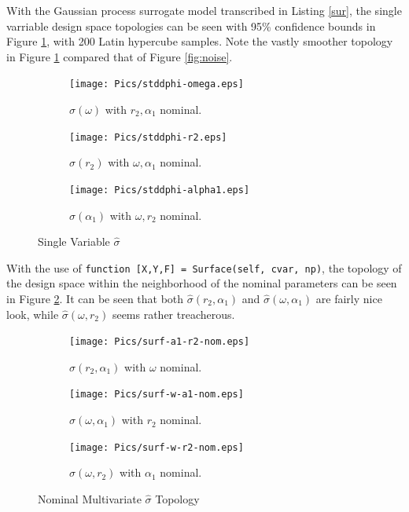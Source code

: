 \documentclass{article}
\begin{document}
With the Gaussian process surrogate model transcribed in Listing \ref{sur}, the single varriable design space topologies can be seen with 95\% confidence bounds in Figure \ref{fig:gauss}, with 200 Latin hypercube samples. Note the vastly smoother topology in Figure \ref{fig:gauss} compared that of Figure \ref{fig:noise}.

\begin{figure}

\begin{subfigure}{0.49\textwidth}
\texttt{[image: Pics/stddphi-omega.eps]} 
\caption{$\hat{\sigma}(\omega)$ with $r_2, \alpha_1$ nominal.}
\end{subfigure}

\begin{subfigure}{0.49\textwidth}
\texttt{[image: Pics/stddphi-r2.eps]}
\caption{$\hat{\sigma}(r_2)$ with $\omega, \alpha_1$ nominal.}
\end{subfigure}

\begin{subfigure}{0.49\textwidth}
\texttt{[image: Pics/stddphi-alpha1.eps]}
\caption{$\hat{\sigma}(\alpha_1)$ with $\omega, r_2$ nominal.}
\end{subfigure}

\caption{Single Variable $\hat{\sigma}$}
\label{fig:gauss}
\end{figure}

With the use of \lstinline{function [X,Y,F] = Surface(self, cvar, np)}, the topology of the design space within the neighborhood of the nominal parameters can be seen in Figure \ref{fig:nomtop}. It can be seen that both $\hat{\sigma}(r_2,\alpha_1)$ and $\hat{\sigma}(\omega,\alpha_1)$ are fairly nice look, while $\hat{\sigma}(\omega,r_2)$ seems rather treacherous.

\begin{figure}

\begin{subfigure}{0.49\textwidth}
\texttt{[image: Pics/surf-a1-r2-nom.eps]} 
\caption{$\hat{\sigma}(r_2,\alpha_1)$ with $\omega$ nominal.}
\end{subfigure}

\begin{subfigure}{0.49\textwidth}
\texttt{[image: Pics/surf-w-a1-nom.eps]}
\caption{$\hat{\sigma}(\omega,\alpha_1)$ with $r_2$ nominal.}
\end{subfigure}

\begin{subfigure}{0.49\textwidth}
\texttt{[image: Pics/surf-w-r2-nom.eps]}
\caption{$\hat{\sigma}(\omega,r_2)$ with $\alpha_1$ nominal.}
\end{subfigure}

\caption{Nominal Multivariate $\hat{\sigma}$ Topology}
\label{fig:nomtop}
\end{figure}
\end{document}
